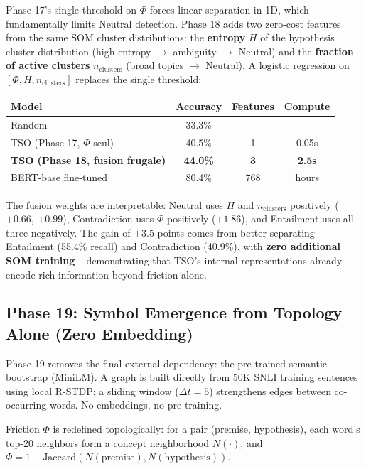 \documentclass{article}
\begin{document}
Phase 17's single-threshold on $\Phi$ forces linear separation in 1D, which fundamentally limits Neutral detection. Phase 18 adds two zero-cost features from the same SOM cluster distributions: the \textbf{entropy} $H$ of the hypothesis cluster distribution (high entropy $\to$ ambiguity $\to$ Neutral) and the \textbf{fraction of active clusters} $n_{\text{clusters}}$ (broad topics $\to$ Neutral). A logistic regression on $[\Phi, H, n_{\text{clusters}}]$ replaces the single threshold:

\begin{center}
\begin{tabular}{lccc}
\toprule
Model & Accuracy & Features & Compute \\
\midrule
Random & 33.3\% & --- & --- \\
TSO (Phase 17, $\Phi$ seul) & 40.5\% & 1 & 0.05s \\
\textbf{TSO (Phase 18, fusion frugale)} & \textbf{44.0\%} & \textbf{3} & \textbf{2.5s} \\
BERT-base fine-tuned & 80.4\% & 768 & hours \\
\bottomrule
\end{tabular}
\end{center}

The fusion weights are interpretable: Neutral uses $H$ and $n_{\text{clusters}}$ positively ($+0.66$, $+0.99$), Contradiction uses $\Phi$ positively ($+1.86$), and Entailment uses all three negatively. The gain of $+3.5$ points comes from better separating Entailment (55.4\% recall) and Contradiction (40.9\%), with \textbf{zero additional SOM training} -- demonstrating that TSO's internal representations already encode rich information beyond friction alone.

\subsection{Phase 19: Symbol Emergence from Topology Alone (Zero Embedding)}

Phase 19 removes the final external dependency: the pre-trained semantic bootstrap (MiniLM). A graph is built directly from 50K SNLI training sentences using local R-STDP: a sliding window ($\Delta t = 5$) strengthens edges between co-occurring words. No embeddings, no pre-training.

Friction $\Phi$ is redefined topologically: for a pair (premise, hypothesis), each word's top-20 neighbors form a concept neighborhood $N(\cdot)$, and $\Phi = 1 - \text{Jaccard}(N(\text{premise}), N(\text{hypothesis}))$.
\end{document}
